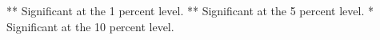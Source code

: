 \begin{table}[h]
\begin{threeparttable}
\begin{subtable}[t]{\linewidth}
\begin{tabular}{|c|cccccccccccccc}
\end{tabular}

\begin{tablenotes}
\item *** Significant at the 1 percent level.    
** Significant at the 5 percent level.   
* Significant at the 10 percent level.
\end{tablenotes}

\end{subtable}



\end{threeparttable}

\end{table}



